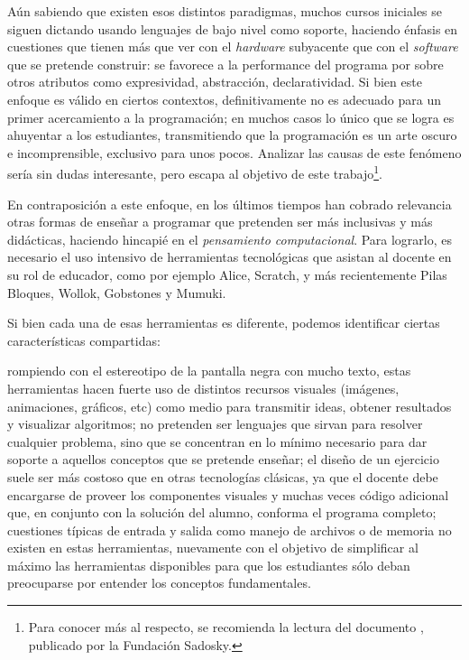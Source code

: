 Aún sabiendo que existen esos distintos paradigmas, muchos cursos iniciales se siguen dictando usando lenguajes de bajo nivel como soporte, haciendo énfasis en cuestiones que tienen más que ver con el \textit{hardware} subyacente que con el \textit{software} que se pretende construir: se favorece a la performance del programa por sobre otros atributos como expresividad, abstracción, declaratividad. Si bien este enfoque es válido en ciertos contextos, definitivamente no es adecuado para un primer acercamiento a la programación; en muchos casos lo único que se logra es ahuyentar a los estudiantes, transmitiendo que la programación es un arte oscuro e incomprensible, exclusivo para unos pocos. Analizar las causas de este fenómeno sería sin dudas interesante, pero escapa al objetivo de este trabajo\footnote{Para conocer más al respecto, se recomienda la lectura del documento , publicado por la Fundación Sadosky.}.

En contraposición a este enfoque, en los últimos tiempos han cobrado relevancia otras formas de enseñar a programar que pretenden ser más inclusivas y más didácticas, haciendo hincapié en el \textit{pensamiento computacional}\cite{Wing}. Para lograrlo, es necesario el uso intensivo de herramientas tecnológicas que asistan al docente en su rol de educador, como por ejemplo Alice, Scratch, y más recientemente Pilas Bloques, Wollok, Gobstones y Mumuki.

Si bien cada una de esas herramientas es diferente, podemos identificar ciertas características compartidas:
\begin{itemize}
   rompiendo con el estereotipo de la pantalla negra con mucho texto, estas herramientas hacen fuerte uso de distintos recursos visuales (imágenes, animaciones, gráficos, etc) como medio para transmitir ideas, obtener resultados y visualizar algoritmos;
   no pretenden ser lenguajes que sirvan para resolver cualquier problema, sino que se concentran en lo mínimo necesario para dar soporte a aquellos conceptos que se pretende enseñar;
   el diseño de un ejercicio suele ser más costoso que en otras tecnologías clásicas, ya que el docente debe encargarse de proveer los componentes visuales y muchas veces código adicional que, en conjunto con la solución del alumno, conforma el programa completo;
   cuestiones típicas de entrada y salida como manejo de archivos o de memoria no existen en estas herramientas, nuevamente con el objetivo de simplificar al máximo las herramientas disponibles para que los estudiantes sólo deban preocuparse por entender los conceptos fundamentales.
\end{itemize}

